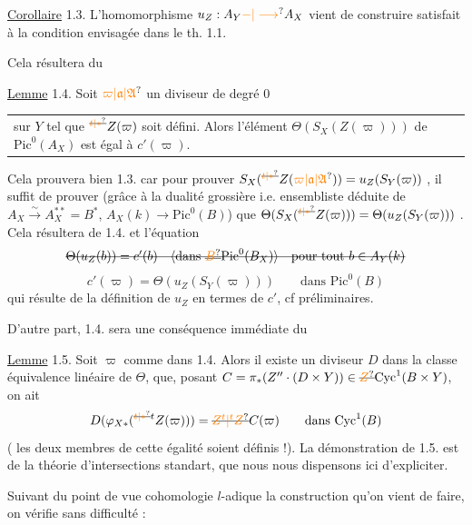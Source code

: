 \uline{Corollaire} 1.3. L'homomorphisme $u_Z:A_Y\unsure{-|\longrightarrow} A_X$  vient de construire satisfait à la condition envisagée dans le th. 1.1. 

Cela résultera du

\uline{Lemme} 1.4. Soit $\unsure{\varpi|\mathfrak{a}|\mathfrak{A}}$ un diviseur de degré $0$
\par\noindent\begin{tabular}{@{}|p{.92\linewidth}@{}}
sur $Y$ tel que $ {}^{\deleted{\unsure{t|*}}}Z(\varpi)$ soit défini. Alors l'élément $\Theta(S_X(Z(\varpi)))$ de $\mathrm{Pic}^0(A_X)$ est égal à $c'(\varpi)$.
\end{tabular}
 Cela prouvera bien 1.3. car pour prouver $S_X({}^{\deleted{\unsure{t|*}}}Z(\unsure{\varpi|\mathfrak{a}|\mathfrak{A}}))=u_Z(S_Y(\varpi))$ , il suffit de prouver (grâce à la dualité grossière i.e. ensembliste  déduite de $A_X\xrightarrow{\sim}A_X^{**}=B^*$,  $A_X(k)\longrightarrow\mathrm{Pic}^0(B)$) que $\Theta(S_X({}^{\deleted{\unsure{t|*}}}Z(\varpi)))=\Theta(u_Z(S_Y(\varpi)))$ .  Cela résultera de 1.4. et  l'équation
\[
\deleted{\Theta(u_Z(b))=c'(b)\quad\inserted{\text{dans }\deleted{\unsure{B}}\mathrm{Pic}^0(B_X)}\quad\text{pour tout } b\in A_Y(k)}
\]
\[
c'(\varpi)=\Theta(u_Z(S_Y(\varpi)))\qquad\text{dans }\mathrm{Pic}^0(B)
\]
qui résulte de la définition de $u_Z$ en termes de $c'$, cf préliminaires.

D'autre part, 1.4. sera une conséquence immédiate du

\uline{Lemme} 1.5. Soit $\varpi$ comme dans 1.4. Alors il existe un diviseur $D$ dans la classe équivalence linéaire de $\Theta$,  que,  posant $C=\pi_*(Z''\cdot(D\times Y))\in\deleted{\unsure{Z}}\mathrm{Cyc}^1(B\times Y)$,  on ait
\[
D(\varphi_{X*}({}^{\deleted{\unsure{t|*}}t}Z(\varpi)))=\deleted{\unsure{Z^t|{}^t Z}}C(\varpi)\qquad\text{dans }\mathrm{Cyc}^1(B)
\]
( les deux membres de cette égalité soient définis !).
La démonstration de 1.5. est de la théorie d'intersections standart, que nous nous dispensons ici d'expliciter.

Suivant du point de vue cohomologie $l$-adique la construction qu'on vient de faire, on vérifie sans difficulté :

